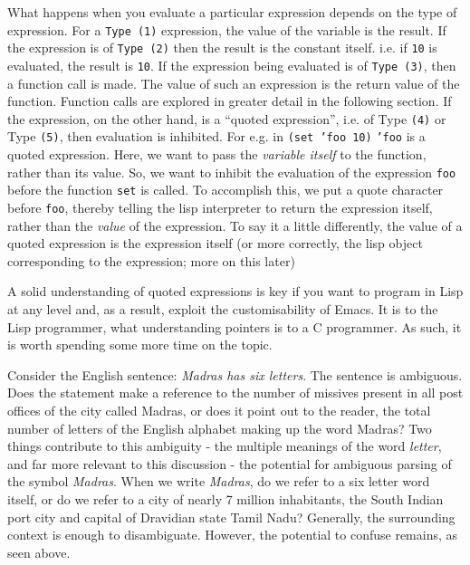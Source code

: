 \documentclass[10pt]{article}
\begin{document}
What happens when you evaluate a particular expression depends on the type of
expression.  For a \texttt{Type (1)} expression, the value of the variable is
the result.  If the expression is of \texttt{Type (2)} then the result is the
constant itself.  i.e. if \texttt{10} is evaluated, the result is \texttt{10}.
If the expression being evaluated is of \texttt{Type (3)}, then a function call
is made.  The value of such an expression is the return value of the function.
Function calls are explored in greater detail in the following section.  If the
expression, on the other hand, is a ``quoted expression'', i.e. of Type
\texttt{(4)} or Type \texttt{(5)}, then evaluation is inhibited.  For e.g. in
\texttt{(set 'foo 10)} \texttt{'foo} is a quoted expression.  Here, we want to
pass the \textit{variable itself} to the function, rather than its value.  So,
we want to inhibit the evaluation of the expression \texttt{foo} before the
function \texttt{set} is called.  To accomplish this, we put a quote character
before \texttt{foo}, thereby telling the lisp interpreter to return the
expression itself, rather than the \textit{value} of the expression.  To say it
a little differently, the value of a quoted expression is the expression itself
(or more correctly, the lisp object corresponding to the expression; more on
this later)

A solid understanding of quoted expressions is key if you want to program in
Lisp at any level and, as a result, exploit the customisability of Emacs.  It
is to the Lisp programmer, what understanding pointers is to a C programmer.
As such, it is worth spending some more time on the topic.

Consider the English sentence: \textit{Madras has six letters}.  The sentence
is ambiguous.  Does the statement make a reference to the number of missives
present in all post offices of the city called Madras, or does it point out to
the reader, the total number of letters of the English alphabet making up the
word Madras?  Two things contribute to this ambiguity - the multiple meanings
of the word \textit{letter}, and far more relevant to this discussion - the
potential for ambiguous parsing of the symbol \textit{Madras}.  When we write
\textit{Madras}, do we refer to a six letter word itself, or do we refer to a
city of nearly 7 million inhabitants, the South Indian port city and capital of
Dravidian state Tamil Nadu?  Generally, the surrounding context is enough to
disambiguate.  However, the potential to confuse remains, as seen above.
\end{document}
